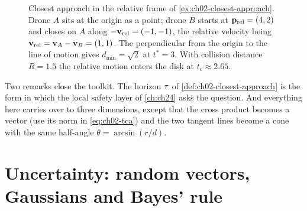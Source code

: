 \begin{figure}[tb]
  \centering
  \caption{Closest approach in the relative frame of \cref{ex:ch02-closest-approach}. Drone $A$ sits at the origin as a point; drone $B$ starts at $\mathbf{p}_{\mathrm{rel}}=(4,2)$ and closes on $A$ along $-\mathbf{v}_{\mathrm{rel}}=(-1,-1)$, the relative velocity being $\mathbf{v}_{\mathrm{rel}}=\mathbf{v}_A-\mathbf{v}_B=(1,1)$. The perpendicular from the origin to the line of motion gives $d_{\min}=\sqrt2$ at $t^*=3$. With collision distance $R=1.5$ the relative motion enters the disk at $t_c\approx2.65$.}
  \label{fig:ch02-closest-approach}
\end{figure}


Two remarks close the toolkit. The horizon $\tau$ of \cref{def:ch02-closest-approach} is the form in which the local safety layer of \cref{ch:ch24} asks the question. And everything here carries over to three dimensions, except that the cross product becomes a vector (use its norm in \cref{eq:ch02-tca}) and the two tangent lines become a cone with the same half-angle $\theta=\arcsin(r/d)$.

\section{Uncertainty: random vectors, Gaussians and Bayes' rule}
\label{sec:ch02-uncertainty}

